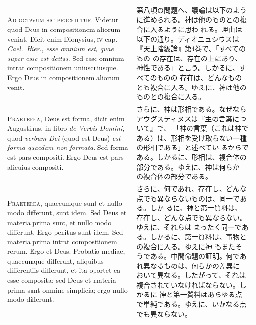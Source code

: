 \documentclass[paper=a4paper,fontsize=10pt,jafontsize=9pt,titlepage]{jlreq}
\begin{document}
\begin{longtable}{p{21em}p{21em}}

{\huge A}{\scshape d octavum sic proceditur}. Videtur quod Deus in
 compositionem aliorum veniat. Dicit enim Dionysius, {\scshape iv} cap.~{\itshape
 Cael.~Hier}., {\itshape esse omnium est, quae super esse est
 deitas}. Sed esse omnium intrat compositionem uniuscuiusque. Ergo Deus
 in compositionem aliorum venit.

&

第八項の問題へ、議論は以下のように進められる。神は他のものとの複合に入るように思わ
 れる。理由は以下の通り。ディオニュシウスは『天上階級論』第4巻で、「すべてのもの
 の存在は、存在の上にあり、神性である」と言う。しかるに、すべてのものの
 存在は、どんなものとも複合に入る。ゆえに、神は他のものとの複合に入る。

\\



{\scshape Praeterea}, Deus est forma, dicit enim Augustinus, in libro
 {\itshape de Verbis Domini}, quod {\itshape verbum Dei} (quod est Deus)
 {\itshape est forma quaedam non formata}. Sed forma est pars
 compositi. Ergo Deus est pars alicuius compositi.

&

さらに、神は形相である。なぜならアウグスティヌスは『主の言葉について』で、
 「神の言葉（これは神である）は、形相を受け取らない一種の形相である」と述べてい
 るからである。しかるに、形相は、複合体の部分である。ゆえに、神は何らか
 の複合体の部分である。

\\

{\scshape Praeterea}, quaecumque sunt et nullo modo differunt, sunt
 idem. Sed Deus et materia prima sunt, et nullo modo differunt. Ergo
 penitus sunt idem. Sed materia prima intrat compositionem rerum. Ergo
 et Deus. Probatio mediae, quaecumque differunt, aliquibus differentiis
 differunt, et ita oportet ea esse composita; sed Deus et materia prima
 sunt omnino simplicia; ergo nullo modo differunt.

&

さらに、何であれ、存在し、どんな点でも異ならないものは、同一である。しか
 るに、神と第一質料は、存在し、どんな点でも異ならない。ゆえに、それらは
 まったく同一である。しかるに、第一質料は、事物との複合に入る。ゆえに神
 もまたそうである。中間命題の証明。何であれ異なるものは、何らかの差異に
 おいて異なる。したがって、それは複合されていなければならない。しかるに
 神と第一質料はあらゆる点で単純である。ゆえに、いかなる点でも異ならない。


\end{longtable}
\end{document}
